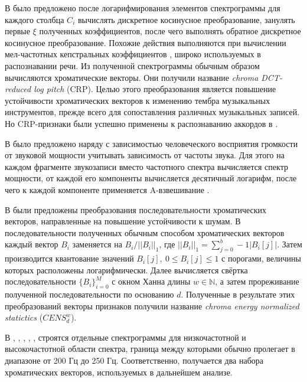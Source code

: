 В \cite{Mueller2009} было предложено после логарифмирования элементов
спектрограммы для каждого столбца $C_i$ вычислять дискретное косинусное
преобразование, занулять первые $\xi$ полученных коэффициентов, после чего
выполнять обратное дискретное косинусное преобразование. Похожие действия
выполняются при вычислении мел-частотных кепстральных коэффициентов
\cite{Logan2000}, широко используемых в распознавании речи. Из полученной
спектрограммы обычным образом вычисляются хроматические векторы. Они получили
название \emph{chroma DCT-reduced log pitch} (CRP). Целью этого преобразования
является повышение устойчивости хроматических векторов к изменению тембра
музыкальных инструментов, прежде всего для сопоставления различных музыкальных
записей. Но CRP-признаки были успешно применены к распознаванию аккордов в
\cite{Cho2011}.

В \cite{Ni2011} было предложено наряду с зависимостью человеческого восприятия
громкости от звуковой мощности учитывать зависимость от частоты звука. Для этого
на каждом фрагменте звукозаписи вместо частотного спектра вычисляется спектр
мощности, от каждой его компоненты вычисляется десятичный логарифм, после чего к
каждой компоненте применяется A-взвешивание \cite{TalbotSmith1999}.

В \cite{Mueller2007} были предложены преобразования последовательности
хроматических векторов, направленные на повышение устойчивости к шумам.
В последовательности полученных обычным способом хроматических векторов каждый
вектор $B_i$ заменяется на $B_i/||B_i||_1$, где $||B_i||_1 = \sum_{j=0}^b-1
|B_i[j]|$. Затем производится квантование значений $B_i[j],~0 \leq B_i[j] \leq
1$ с порогами, величины которых расположены логарифмически. Далее вычисляется
свёртка последовательности $\{B_i\}_{i=0}^M$ с окном Ханна длины $w \in
\mathbb{N}$, а затем прореживание полученной последовательности по основанию
$d$. Полученные в результате этих преобразований векторы признаков получили
название \emph{chroma energy normalized statictics} ($CENS_d^w$).

В \cite{Mauch2008}, \cite{Mauch2009}, \cite{Khadkevich2011}, \cite{Ni2011},
\cite{DeHaas2012}, \cite{Chen2012} строятся отдельные спектрограммы для
низкочастотной и высокочастотной области спектра, граница между которыми обычно
пролегает в диапазоне от 200 Гц до 250 Гц. Соответственно, получается два
набора хроматических векторов, используемых в дальнейшем анализе.

